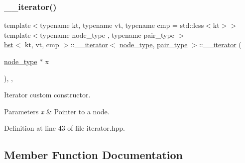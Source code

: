 \subsubsection{\texorpdfstring{\+\_\+\+\_\+iterator()}{\_\_iterator()}}
{\footnotesize\ttfamily template$<$typename kt, typename vt, typename cmp = std\+::less$<$kt$>$$>$ \\
template$<$typename node\+\_\+type , typename pair\+\_\+type $>$ \\
\hyperlink{classbst}{bst}$<$ kt, vt, cmp $>$\+::\hyperlink{classbst_1_1____iterator}{\+\_\+\+\_\+iterator}$<$ \hyperlink{classbst_a062eb2a1ac54802dbc4f0f74ae2afd01}{node\+\_\+type}, \hyperlink{classbst_a7b11cca2a3b4394915600194f741ab16}{pair\+\_\+type} $>$\+::\hyperlink{classbst_1_1____iterator}{\+\_\+\+\_\+iterator} (\begin{DoxyParamCaption}\item[{\hyperlink{classbst_a062eb2a1ac54802dbc4f0f74ae2afd01}{node\+\_\+type} $\ast$}]{x }\end{DoxyParamCaption})\hspace{0.3cm}{\ttfamily [inline]}, {\ttfamily [explicit]}, {\ttfamily [private]}}



Iterator custom constructor. 


\begin{DoxyParams}{Parameters}
{\em x} & Pointer to a node. \\
\hline
\end{DoxyParams}


Definition at line 43 of file iterator.\+hpp.



\subsection{Member Function Documentation}
\mbox{\label{classbst_1_1____iterator_aa4e7abcc2bb06e8778e3912803b96433}} 
